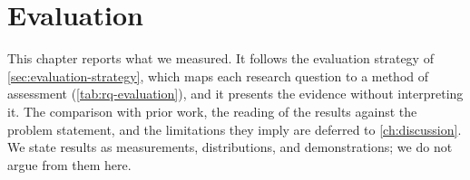 \chapter{Evaluation}
\label{ch:evaluation}


This chapter reports what we measured.
It follows the evaluation strategy of \cref{sec:evaluation-strategy}, which maps each research question to a method of assessment (\cref{tab:rq-evaluation}), and it presents the evidence without interpreting it.
The comparison with prior work, the reading of the results against the problem statement, and the limitations they imply are deferred to \cref{ch:discussion}.
We state results as measurements, distributions, and demonstrations; we do not argue from them here.









